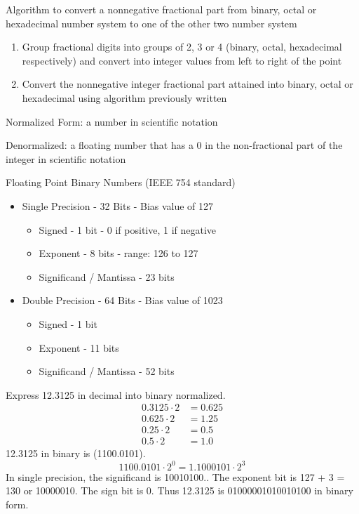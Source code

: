 \documentclass[12pt]{article}
\begin{document}
Algorithm to convert a nonnegative fractional part from binary, octal or hexadecimal number system to one of the other two number system \begin{enumerate}
\item Group fractional digits into groups of 2, 3 or 4 (binary, octal, hexadecimal respectively) and convert into integer values from left to right of the point
\item Convert the nonnegative integer fractional part attained into binary, octal or hexadecimal using algorithm previously written \end{enumerate} 
\begin{definition} Normalized Form: a number in scientific notation \end{definition}
\begin{definition} Denormalized: a floating number that has a 0 in the non-fractional part of the integer in scientific notation \end{definition}
Floating Point Binary Numbers (IEEE 754 standard) \begin{itemize} 
\item  Single Precision - 32 Bits - Bias value of 127 \begin{itemize} 
\item Signed  - 1 bit - 0 if positive, 1 if negative
\item Exponent - 8 bits - range: 126 to 127
\item Significand / Mantissa - 23 bits  \end{itemize} 
\item Double Precision - 64 Bits - Bias value of 1023 \begin{itemize}
\item Signed - 1 bit 
\item Exponent - 11 bits 
\item Significand / Mantissa - 52 bits \end{itemize} \end{itemize} 
\begin{example} Express 12.3125 in decimal into binary normalized. $$\begin{aligned} 
0.3125 \cdot 2 &= 0.625 \\
0.625 \cdot 2 &= 1.25 \\
0.25 \cdot 2 &= 0.5 \\
0.5 \cdot 2 &= 1.0 \end{aligned} $$ 
12.3125 in binary is (1100.0101). 
$$ 1100.0101 \cdot 2^0 = 1.1000101 \cdot 2^3 $$  
In single precision, the significand is 10010100.. The exponent bit is 127 + 3 = 130 or 10000010. The sign bit is 0. 
Thus 12.3125 is 01000001010010100 in binary form. \end{example} 
\end{document}
